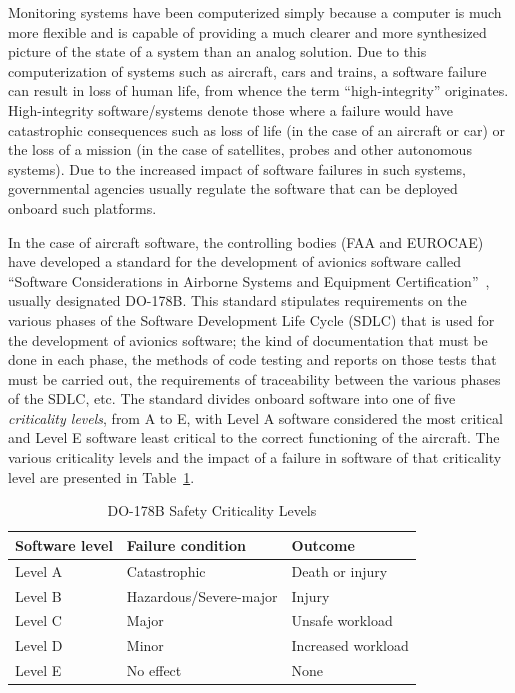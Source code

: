 Monitoring systems have been computerized simply because a computer is
much more flexible and is capable of providing a much clearer and more
synthesized picture of the state of a system than an analog
solution. Due to this computerization of systems such as aircraft,
cars and trains, a software failure can result in loss of human life,
from whence the term ``high-integrity'' originates. High-integrity
software/systems denote those where a failure would have catastrophic
consequences such as loss of life (in the case of an aircraft or car)
or the loss of a mission (in the case of satellites, probes and other
autonomous systems). Due to the increased impact of software failures
in such systems, governmental agencies usually regulate the software
that can be deployed onboard such platforms.

In the case of aircraft software, the controlling bodies (FAA and
EUROCAE) have developed a standard for the development of avionics
software called ``Software Considerations in Airborne Systems and
Equipment Certification''~\cite{do178b}, usually designated
DO-178B. This standard stipulates requirements on the various phases
of the Software Development Life Cycle (SDLC) that is used for the
development of avionics software; the kind of documentation that must
be done in each phase, the methods of code testing and reports on
those tests that must be carried out, the requirements of traceability
between the various phases of the SDLC, etc. The standard divides
onboard software into one of five \emph{criticality levels}, from A to
E, with Level A software considered the most critical and Level E
software least critical to the correct functioning of the
aircraft. The various criticality levels and the impact of a failure
in software of that criticality level are presented in
Table~\ref{tab:criticality_levels}.

\begin{table}
\centering
\begin{tabular}{|l|l|l|}
\hline
\textbf{Software level}&\textbf{Failure condition}&\textbf{Outcome}\\
\hline
Level A & Catastrophic & Death or injury\\
Level B & Hazardous/Severe-major & Injury\\
Level C & Major & Unsafe workload\\
Level D & Minor & Increased workload\\
Level E & No effect & None\\
\hline
\end{tabular}
\caption{DO-178B Safety Criticality Levels}
\label{tab:criticality_levels}
\end{table}

